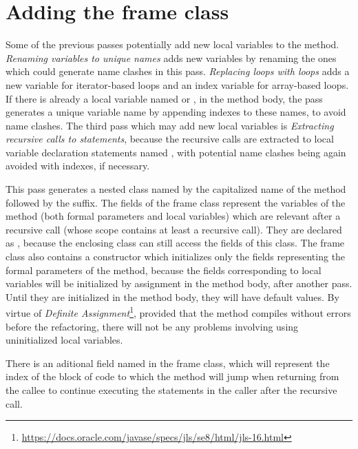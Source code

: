 \section{Adding the frame class}

Some of the previous passes potentially add new local variables to the method. \textit{Renaming variables to unique
names} adds new variables by renaming the ones which could generate name clashes in this pass.
\textit{Replacing  loops with  loops} adds a new  variable for iterator-based
 loops and an index variable  for array-based  loops. If there is already a local
variable named  or , in the method body, the pass generates a unique variable name by appending
indexes to these names, to avoid name clashes. The third pass which may add new local variables is
\textit{Extracting recursive calls to statements}, because the recursive calls are extracted to local variable
declaration statements named , with potential name clashes being again avoided with indexes, if necessary.

This pass generates a  nested class named by the capitalized name of the method followed by the
 suffix. The fields of the frame class represent the variables of the method (both formal parameters and
local variables) which are relevant after a recursive call (whose scope contains at least a recursive call). They are
declared as , because the enclosing class can still access the fields of this class. The frame class also
contains a  constructor which initializes only the fields representing the formal parameters of the
method, because the fields corresponding to local variables will be initialized by assignment in the method body,
after another pass. Until they are initialized in the method body, they will have default values. By virtue of
\textit{Definite Assignment}\footnote{\url{https://docs.oracle.com/javase/specs/jls/se8/html/jls-16.html}}, provided
that the method compiles without errors before the refactoring, there will not be any problems involving using
uninitialized local variables.

There is an aditional  field named  in the frame class, which will represent the index of the
block of code to which the method will jump when returning from the callee to continue executing the statements in the
caller after the recursive call.